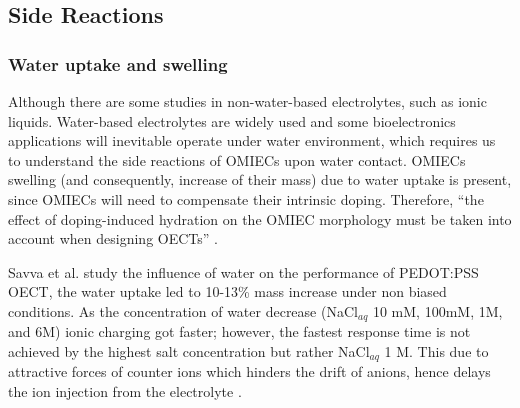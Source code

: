\subsection{Side Reactions} \label{subsec:sidereac}



\subsubsection{Water uptake and swelling}

Although there are some studies in non-water-based electrolytes, such as ionic liquids. Water-based electrolytes are widely used and some bioelectronics applications will inevitable operate under water environment, which requires us to understand the side reactions of OMIECs upon water contact. OMIECs swelling (and consequently, increase of their mass) due to water uptake is present, since OMIECs will need to compensate their intrinsic doping. Therefore, ``the effect of doping-induced hydration on the OMIEC morphology must be taken into account when designing OECTs'' \cite{savvaBalancingIonicElectronic2020}.

Savva et al. study the influence of water on the performance of PEDOT:PSS OECT, the water uptake %
led to 10-13\% mass increase under non biased conditions. As the concentration of water decrease (NaCl$_{aq}$ 10 mM, 100mM, 1M, and 6M) ionic charging got faster; %
however, the fastest %
response time is not achieved by the highest salt concentration but rather NaCl$_{aq}$ 1 M. This due to attractive forces of counter ions which %
hinders the drift of anions, hence delays the ion injection from the electrolyte %
\cite{savvaInfluenceWaterPerformance2019}.

